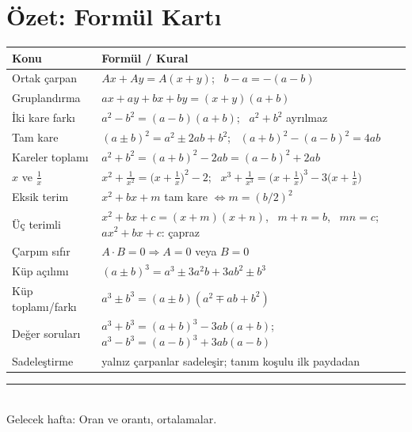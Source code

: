 \documentclass[11pt,a4paper]{article}
\newcounter{alis}
\begin{document}
\section{Özet: Formül Kartı}
\begin{center}
\renewcommand{\arraystretch}{1.3}
\begin{tabular}{@{}ll@{}}
\toprule
Konu & Formül / Kural\\\midrule
Ortak çarpan & \(Ax+Ay=A(x+y)\); \ \(b-a=-(a-b)\)\\
Gruplandırma & \(ax+ay+bx+by=(x+y)(a+b)\)\\
İki kare farkı & \(a^2-b^2=(a-b)(a+b)\); \ \(a^2+b^2\) ayrılmaz\\
Tam kare & \((a\pm b)^2=a^2\pm 2ab+b^2\); \ \((a+b)^2-(a-b)^2=4ab\)\\
Kareler toplamı & \(a^2+b^2=(a+b)^2-2ab=(a-b)^2+2ab\)\\
\(x\) ve \(\frac{1}{x}\) & \(x^2+\frac{1}{x^2}=\big(x+\frac{1}{x}\big)^2-2\); \ \(x^3+\frac{1}{x^3}=\big(x+\frac{1}{x}\big)^3-3\big(x+\frac{1}{x}\big)\)\\
Eksik terim & \(x^2+bx+m\) tam kare \(\Leftrightarrow m=(b/2)^2\)\\
Üç terimli & \(x^2+bx+c=(x+m)(x+n)\), \ \(m+n=b\), \ \(mn=c\); \ \(ax^2+bx+c\): çapraz\\
Çarpım sıfır & \(A\cdot B=0\Rightarrow A=0\) veya \(B=0\)\\
Küp açılımı & \((a\pm b)^3=a^3\pm 3a^2b+3ab^2\pm b^3\)\\
Küp toplamı/farkı & \(a^3\pm b^3=(a\pm b)(a^2\mp ab+b^2)\)\\
Değer soruları & \(a^3+b^3=(a+b)^3-3ab(a+b)\); \ \(a^3-b^3=(a-b)^3+3ab(a-b)\)\\
Sadeleştirme & yalnız çarpanlar sadeleşir; tanım koşulu ilk paydadan\\\bottomrule
\end{tabular}
\end{center}

\newpage


\vspace{6pt}
\noindent\textcolor{anamavi}{\rule{\textwidth}{0.5pt}}\\
{\small Gelecek hafta: Oran ve orantı, ortalamalar.}
\end{document}
